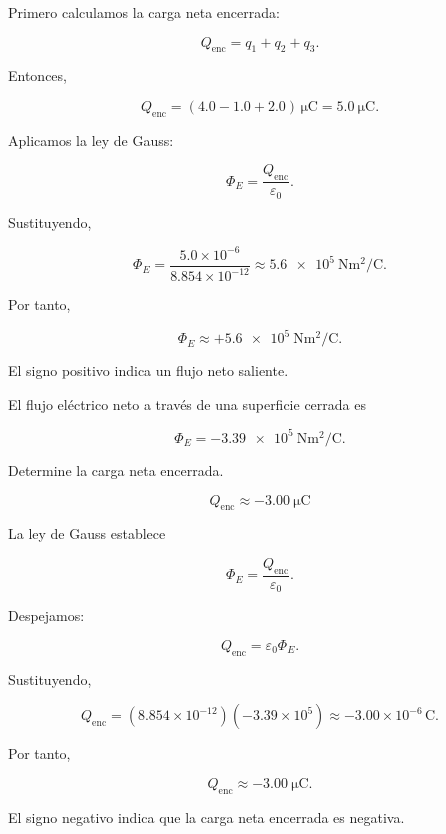 \begin{explicacion}

Primero calculamos la carga neta encerrada:

\[
Q_{\text{enc}}=q_1+q_2+q_3.
\]

Entonces,

\[
Q_{\text{enc}}=(4.0-1.0+2.0)\,\si{\micro\coulomb}
=\SI{5.0}{\micro\coulomb}.
\]

Aplicamos la ley de Gauss:

\[
\Phi_E=\frac{Q_{\text{enc}}}{\varepsilon_0}.
\]

Sustituyendo,

\[
\Phi_E=
\frac{5.0\times10^{-6}}{8.854\times10^{-12}}
\approx
\SI{5.6e5}{\newton\metre\squared\per\coulomb}.
\]

Por tanto,

\[
\boxed{
\Phi_E\approx+\SI{5.6e5}{\newton\metre\squared\per\coulomb}
}.
\]

El signo positivo indica un flujo neto saliente.

\end{explicacion}


\begin{ejercicio}

El flujo eléctrico neto a través de una superficie cerrada es

\[
\Phi_E=-\SI{3.39e5}{\newton\metre\squared\per\coulomb}.
\]

Determine la carga neta encerrada.

\end{ejercicio}

\begin{respuesta}

\[
\boxed{Q_{\text{enc}}\approx-\SI{3.00}{\micro\coulomb}}
\]

\end{respuesta}

\begin{explicacion}

La ley de Gauss establece

\[
\Phi_E=\frac{Q_{\text{enc}}}{\varepsilon_0}.
\]

Despejamos:

\[
Q_{\text{enc}}=\varepsilon_0\Phi_E.
\]

Sustituyendo,

\[
Q_{\text{enc}}
=(8.854\times10^{-12})(-3.39\times10^5)
\approx-3.00\times10^{-6}\,\si{\coulomb}.
\]

Por tanto,

\[
\boxed{Q_{\text{enc}}\approx-\SI{3.00}{\micro\coulomb}}.
\]

El signo negativo indica que la carga neta encerrada es negativa.

\end{explicacion}


